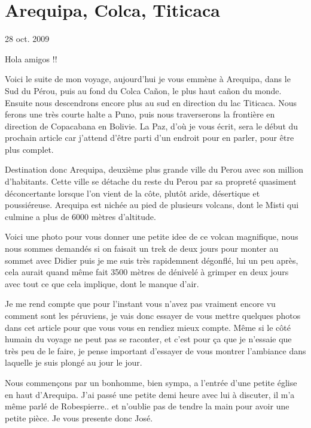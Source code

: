 \section{Arequipa, Colca, Titicaca}

28 oct. 2009

\begin{multicols}{2}

Hola amigos !!

Voici le suite de mon voyage, aujourd'hui je vous emmène à Arequipa, dans le Sud du Pérou, puis au fond du Colca Cañon, le plus haut cañon du monde. Ensuite nous descendrons encore plus au sud en direction du lac Titicaca. Nous ferons une très courte halte a Puno, puis nous traverserons la frontière en direction de Copacabana en Bolivie. La Paz, d'où je vous écrit, sera le début du prochain article car j'attend d'être parti d'un endroit pour en parler, pour être plus complet.

Destination donc Arequipa, deuxième plus grande ville du Perou avec son million d'habitants. Cette ville se détache du reste du Perou par sa propreté quasiment déconcertante lorsque l'on vient de la côte, plutôt aride, désertique et poussiéreuse. Arequipa est nichée au pied de plusieurs volcans, dont le Misti qui culmine a plus de 6000 mètres d'altitude.

Voici une photo pour vous donner une petite idee de ce volcan magnifique, nous nous sommes demandés si on faisait un trek de deux jours pour monter au sommet avec Didier puis je me suis très rapidemnent dégonflé, lui un peu après, cela aurait quand même fait 3500 mètres de dénivelé à grimper en deux jours avec tout ce que cela implique, dont le manque d'air.


Je me rend compte que pour l'instant vous n'avez pas vraiment encore vu comment sont les péruviens, je vais donc essayer de vous mettre quelques photos dans cet article pour que vous vous en rendiez mieux compte. Même si le côté humain du voyage ne peut pas se raconter, et c'est pour ça que je n'essaie que très peu de le faire, je pense important d'essayer de vous montrer l'ambiance dans laquelle je suis plongé au jour le jour.

Nous commençons par un bonhomme, bien sympa, a l'entrée d'une petite église en haut d'Arequipa. J'ai passé une petite demi heure avec lui à discuter, il m'a même parlé de Robespierre.. et n'oublie pas de tendre la main pour avoir une petite pièce. Je vous presente donc José.


\end{multicols}
